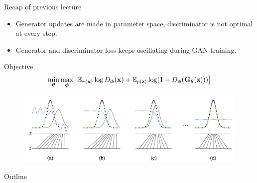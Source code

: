 \begin{frame}{Recap of previous lecture}
	\begin{itemize}
		\item Generator updates are made in parameter space, discriminator is not optimal at every step.
		\item Generator and discriminator loss keeps oscillating during GAN training.
	\end{itemize}
	\begin{block}{Objective}
		\vspace{-0.5cm}
		\[
		\min_{\boldsymbol{\theta}} \max_{\boldsymbol{\phi}} \left[ \mathbb{E}_{\pi(\mathbf{x})} \log D_{\boldsymbol{\phi}}(\mathbf{x}) + \mathbb{E}_{p(\mathbf{z})} \log (1 - D_{\boldsymbol{\phi}}(\mathbf{G}_{\boldsymbol{\theta}}(\mathbf{z}))) \right]
		\]
		\vspace{-0.5cm}
	\end{block}
	\begin{figure}
		\centering
		\includegraphics[width=1.0\linewidth]{figs/gan_1}
	\end{figure}
\end{frame}
\begin{frame}{Outline}
	\tableofcontents
\end{frame}
